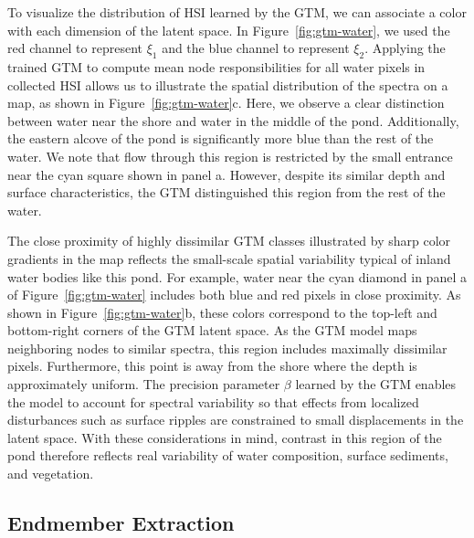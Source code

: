 To visualize the distribution of HSI learned by the GTM, we can associate a color with each dimension of the latent space. In Figure~\ref{fig:gtm-water}, we used the red channel to represent $\xi_1$ and the blue channel to represent $\xi_2$. Applying the trained GTM to compute mean node responsibilities for all water pixels in collected HSI allows us to illustrate the spatial distribution of the spectra on a map, as shown in Figure~\ref{fig:gtm-water}c. Here, we observe a clear distinction between water near the shore and water in the middle of the pond. Additionally, the eastern alcove of the pond is significantly more blue than the rest of the water. We note that flow through this region is restricted by the small entrance near the cyan square shown in panel a. However, despite its similar depth and surface characteristics, the GTM distinguished this region from the rest of the water.

The close proximity of highly dissimilar GTM classes illustrated by sharp color gradients in the map reflects the small-scale spatial variability typical of inland water bodies like this pond. For example, water near the cyan diamond in panel a of Figure~\ref{fig:gtm-water} includes both blue and red pixels in close proximity. As shown in Figure~\ref{fig:gtm-water}b, these colors correspond to the top-left and bottom-right corners of the GTM latent space. As the GTM model maps neighboring nodes to similar spectra, this region includes maximally dissimilar pixels. Furthermore, this point is away from the shore where the depth is approximately uniform. The precision parameter $\beta$ learned by the GTM enables the model to account for spectral variability so that effects from localized disturbances such as surface ripples are constrained to small displacements in the latent space. With these considerations in mind, contrast in this region of the pond therefore reflects real variability of water composition, surface sediments, and vegetation.


\subsection{Endmember Extraction}

